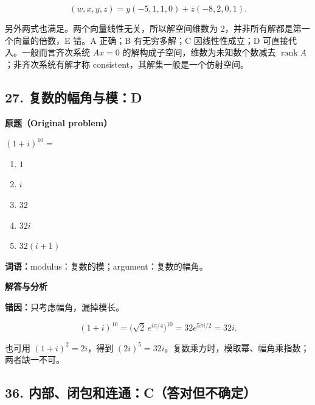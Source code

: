 \documentclass[11pt,a4paper]{ctexart}
\begin{document}
\[ (w,x,y,z)=y(-5,1,1,0)+z(-8,2,0,1). \]

另外两式也满足。两个向量线性无关，所以解空间维数为
2，并非所有解都是第一个向量的倍数，E 错。A 正确；B 有无穷多解；C
因线性性成立；D 可直接代入。一般而言齐次系统 \(Ax=0\)
的解构成子空间，维数为未知数个数减去
\(\operatorname{rank}A\)；非齐次系统有解才称
consistent，其解集一般是一个仿射空间。

\hypertarget{ux590dux6570ux7684ux5e45ux89d2ux4e0eux6a21d}{%
\subsection{27.
复数的幅角与模：D}\label{ux590dux6570ux7684ux5e45ux89d2ux4e0eux6a21d}}

\textbf{原题（Original problem）}\par
$(1+i)^{10}=$
\begin{enumerate}[label=(\Alph*),nosep]
\item $1$ \item $i$ \item $32$ \item $32i$ \item $32(i+1)$
\end{enumerate}
\textbf{词语：}modulus：复数的模；argument：复数的幅角。

\textbf{解答与分析}\par


\textbf{错因：}只考虑幅角，漏掉模长。

\[ (1+i)^{10}=\bigl(\sqrt2\,e^{i\pi/4}\bigr)^{10}=32e^{5\pi i/2}=32i. \]

也可用 \((1+i)^2=2i\)，得到
\((2i)^5=32i\)。复数乘方时，模取幂、幅角乘指数；两者缺一不可。

\hypertarget{ux5185ux90e8ux95edux5305ux548cux8fdeux901acux7b54ux5bf9ux4f46ux4e0dux786eux5b9a}{%
\subsection{36.
内部、闭包和连通：C（答对但不确定）}\label{ux5185ux90e8ux95edux5305ux548cux8fdeux901acux7b54ux5bf9ux4f46ux4e0dux786eux5b9a}}
\end{document}
